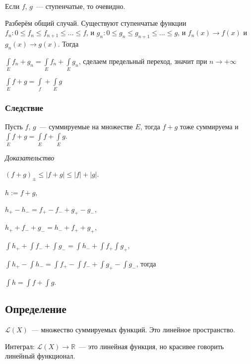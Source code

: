 \documentclass{article}
\begin{document}
            Если $f$, $g$~--- ступенчатые, то очевидно.
            
            Разберём общий случай. Существуют ступенчатые функции $f_n : 0 \leqslant f_n \leqslant f_{n + 1} \leqslant \ldots \leqslant f$, и $g_n : 0 \leqslant g_n \leqslant g_{n + 1} \leqslant \ldots \leqslant g$, и $f_n(x) \rightarrow f(x)$ и $g_n(x) \rightarrow g(x)$. Тогда
            
            $\int\limits_{E} f_n + g_n = \int\limits_{E} f_n + \int\limits_{E} g_n$, сделаем предельный переход, значит при $n \rightarrow +\infty$
            
            $\int\limits_{E} f + g = \int\limits_ f + \int\limits_{E} g$
            
        \subsubsection{Следствие}
        
            Пусть $f$, $g$~--- суммируемые на множестве $E$, тогда $f + g$ тоже суммируема и $\int\limits_{E} f + g = \int\limits_{E} f + \int\limits_{E} g$.
            
            \textit{Доказательство}
            
                $(f + g)_{\pm} \leqslant | f + g | \leqslant |f| + |g|$.
                
                $h := f + g$,
                
                $h_+ - h_- = f_+ - f_- + g_+ - g_-$,
                
                $h_+ + f_- + g_- = h_- + f_+ + g_+$,
                
                $\int h_+ + \int f_- + \int g_- = \int h_- + \int f_+ \int g_+$,
                
                $\int h_+ - \int h_- = \int f_+ - \int f_- + \int g_+ - \int g_-$, тогда
                
                $\int h = \int f + \int g$.
                
    \subsection{Определение}
    
        $\mathcal{L} (X)$~--- множество суммируемых функций. Это линейное пространство.
        
        Интеграл: $\mathcal{L}(X) \rightarrow \mathbb{R}$~--- это линейная функция, но красивее говорить линейный функционал.
        
\end{document}
